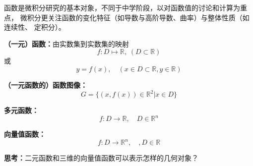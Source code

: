 	函数是微积分研究的基本对象，不同于中学阶段，以对函数值的讨论和计算为重点，
	微积分更关注函数的变化特征（如导数与高阶导数、曲率）与整体性质（如连续性、
	定积分）。
	
	{\bf （一元）函数：}由实数集到实数集的映射
	$$f:D\mapsto\mathbb{R},\;(D\subset\mathbb{R})$$
	或
	$$y=f(x),\quad (x\in D\subset\mathbb{R},y\in\mathbb{R})$$
	
	{\bf （一元函数的）函数图像：}
	$$G=\{(x,f(x))\in\mathbb{R}^2|x\in D\}$$
	
	\begin{shaded}
		{\bf 多元函数：} 
		$$f:D\to\mathbb{R},\quad D\in\mathbb{R}^n$$
		
		{\bf 向量值函数：}
		$$f:D\to\mathbb{R}^n,\quad, D\in\mathbb{R}$$
		
		{\bf 思考：}二元函数和三维的向量值函数可以表示怎样的几何对象？
	\end{shaded}
	
	\begin{center}
		\quad	
	\end{center}
	
